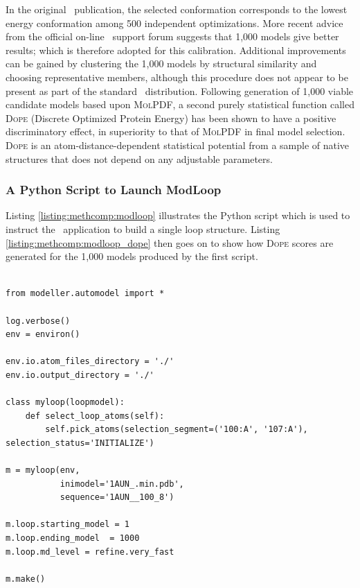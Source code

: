 In the original \modloop\ publication, the selected conformation
corresponds to the lowest energy conformation among 500 independent optimizations.
More recent advice from the official on-line \modeller\ support forum suggests that 1,000 models give better results;
which is therefore adopted for this calibration. Additional improvements can be gained by clustering the 1,000 models by structural
similarity and choosing representative members, although this procedure does not appear to be present as part of the standard \modeller\ distribution. 
Following generation of 1,000 viable candidate models based upon \textsc{MolPDF}, a second purely statistical function called \textsc{Dope}\cite{FORCEFIELD:DOPE} (Discrete Optimized Protein Energy) has been shown to have a positive discriminatory effect, in superiority to that of \textsc{MolPDF} in final model selection.
\textsc{Dope} is an atom-distance-dependent statistical potential from a sample of native structures that does not depend on any adjustable parameters.

\subsubsection{A Python Script to Launch ModLoop }

Listing \ref{listing:methcomp:modloop} illustrates the Python script which is used to instruct the \modeller\ application to build a single loop structure. Listing \ref{listing:methcomp:modloop_dope} then goes on to show how \textsc{Dope} scores are generated for the 1,000 models produced by the first script.

\lstset{language=Python}
\begin{lstlisting}[float, caption={\modloop\ main\ Python launch script.}, label=listing:methcomp:modloop]

from modeller.automodel import *

log.verbose()
env = environ()

env.io.atom_files_directory = './'
env.io.output_directory = './'

class myloop(loopmodel):
    def select_loop_atoms(self):
        self.pick_atoms(selection_segment=('100:A', '107:A'), selection_status='INITIALIZE')

m = myloop(env,
           inimodel='1AUN_.min.pdb',
           sequence='1AUN__100_8')

m.loop.starting_model = 1
m.loop.ending_model  = 1000
m.loop.md_level = refine.very_fast

m.make()
\end{lstlisting}


